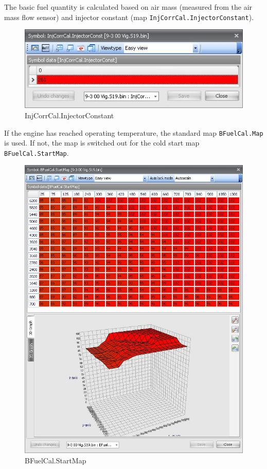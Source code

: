 \documentclass[11pt,a4paper]{book}
\begin{document}
The basic fuel quantity is calculated based on air mass (measured from the air
mass flow sensor) and injector constant
(map \texttt{InjCorrCal.InjectorConstant}).
\begin{figure}
    \centering
    \includegraphics[width=.9\linewidth]{injectorconstant.png}
    \caption{InjCorrCal.InjectorConstant}
    \label{fig:injectorconstant}
\end{figure}
If the engine has reached operating temperature, the standard map
\texttt{BFuelCal.Map} is used. If not, the map is switched out for the cold
start map \texttt{BFuelCal.StartMap}.
\begin{figure}
    \centering
    \includegraphics[width=.9\linewidth]{startmap.png}
    \caption{BFuelCal.StartMap}
    \label{fig:startmap}
\end{figure}
\end{document}
